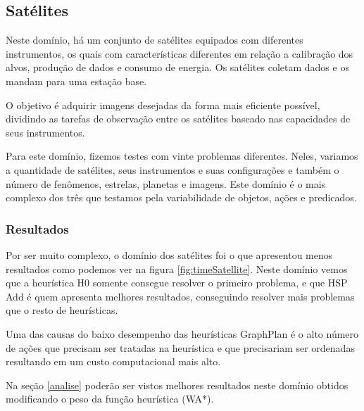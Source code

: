 \subsection{Satélites}\label{problemas:satelites}

Neste domínio, há um conjunto de satélites equipados com diferentes instrumentos, os quais com características diferentes em relação a calibração dos alvos, produção de dados e consumo de energia. Os satélites coletam dados e os mandam para uma estação base.

O objetivo é adquirir imagens desejadas da forma mais eficiente possível, dividindo as tarefas de observação entre os satélites baseado nas capacidades de seus instrumentos.

Para este domínio, fizemos testes com vinte problemas diferentes. Neles, variamos a quantidade de satélites, seus instrumentos e suas configurações e também o número de fenômenos, estrelas, planetas e imagens. Este domínio é o mais complexo dos três que testamos pela variabilidade de objetos, ações e predicados.

\subsubsection{Resultados}\label{problemas:satelites:resultados}

Por ser muito complexo, o domínio dos satélites foi o que apresentou menos resultados como podemos ver na figura \ref{fig:timeSatellite}.
Neste domínio vemos que a heurística H0 somente consegue resolver o primeiro problema, e que HSP Add é quem apresenta melhores resultados, conseguindo resolver mais problemas que o resto de heurísticas.

Uma das causas do baixo desempenho das heurísticas GraphPlan é o alto número de ações que precisam ser tratadas na heurística e que precisariam ser ordenadas resultando em um custo computacional mais alto.

Na seção \ref{analise} poderão ser vistos melhores resultados neste domínio obtidos modificando o peso da função heurística (WA*).


